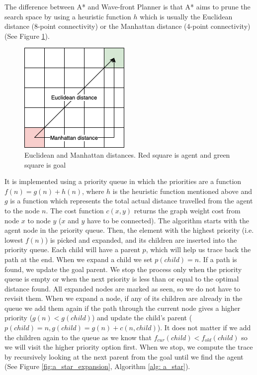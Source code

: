 The difference between A* and Wave-front Planner is that A* aims to prune the search space by using a heuristic function $h$ which is usually the Euclidean distance (8-point connectivity) or the Manhattan distance (4-point connectivity) (See Figure \ref{fig:distances}).

\begin{figure}[h!]
  \centering
  \includegraphics[scale=0.5]{images/distances.png}
  \caption{Euclidean and Manhattan distances. Red square is agent and green square is goal}
  \label{fig:distances}
\end{figure}

It is implemented using a priority queue in which the priorities are a function $f(n) = g(n) + h(n)$, where $h$ is the heuristic function mentioned above and $g$ is a function which represents the total actual distance travelled from the agent to the node $n$. The cost function $c(x, y)$ returns the graph weight cost from node $x$ to node $y$ ($x$ and $y$ have to be connected). The algorithm starts with the agent node in the priority queue. Then, the element with the highest priority (i.e. lowest $f(n)$) is picked and expanded, and its children are inserted into the priority queue. Each child will have a parent $p$, which will help us trace back the path at the end. When we expand a child we set $p(child) = n$. If a path is found, we update the goal parent. We stop the process only when the priority queue is empty or when the next priority is less than or equal to the optimal distance found. All expanded nodes are marked as seen, so we do not have to revisit them. When we expand a node, if any of its children are already in the queue we add them again if the path through the current node gives a higher priority ($g(n) < g(child)$) and update the child's parent ($p(child) = n, g(child) = g(n) + c(n, child)$). It does not matter if we add the children again to the queue as we know that $f_{cur}(child) < f_{old}(child)$ so we will visit the higher priority option first. When we stop, we compute the trace by recursively looking at the next parent from the goal until we find the agent (See Figure \ref{fig:a_star_expansion}, Algorithm \ref{alg: a_star}).


